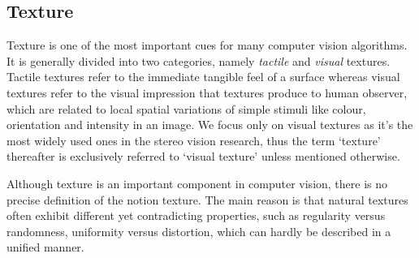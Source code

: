 
\subsection{Texture}
Texture is one of the most important cues for many computer vision algorithms. It is generally divided into two categories, namely \textit{tactile} and \textit{visual} textures. Tactile textures refer to the immediate tangible feel of a surface whereas visual textures refer to the visual impression that textures produce to human observer, which are related to local spatial variations of simple stimuli like colour, orientation and intensity in an image. We focus only on visual textures as it's the most widely used ones in the stereo vision research, thus the term `texture' thereafter is exclusively referred to `visual texture' unless mentioned otherwise.

Although texture is an important component in computer vision, there is no precise definition of the notion texture. The main reason is that natural textures often exhibit different yet contradicting properties, such as regularity versus randomness, uniformity versus distortion, which can hardly be described in a unified manner. 



